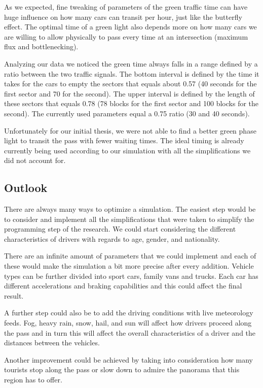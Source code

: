 \documentclass[11pt,a4paper,parskip=half-]{article}
\begin{document}
As we expected, fine tweaking of parameters of the green traffic time can have huge influence on how many cars can transit per hour, just like the butterfly effect. The optimal time of a green light also depends more on how many cars we are willing to allow physically to pass every time at an intersection (maximum flux and bottlenecking). 



Analyzing our data we noticed the green time always falls in a range defined by a ratio between the two traffic signals. The bottom interval is defined by the time it takes for the cars to empty the sectors that equals about 0.57 (40 seconds for the first sector and 70 for the second). The upper interval is defined by the length of these sectors that equals 0.78 (78 blocks for the first sector and 100 blocks for the second). The currently used parameters equal a 0.75 ratio (30 and 40 seconds). 


Unfortunately for our initial thesis, we were not able to find a better green phase light to transit the pass with fewer waiting times. The ideal timing is already currently being used according to our simulation with all the simplifications we did not account for. 




\subsection{Outlook}

There are always many ways to optimize a simulation. The easiest step would be to consider and implement all the simplifications that were taken to simplify the programming step of the research. We could start considering the different characteristics of drivers with regards to age, gender, and nationality.

There are an infinite amount of parameters that we could implement and each of these would make the simulation a bit more precise after every addition. Vehicle types can be further divided into sport cars, family vans and trucks. Each car has different accelerations and braking capabilities and this could affect the final result.

A further step could also be to add the driving conditions with live meteorology feeds. Fog, heavy rain, snow, hail, and sun will affect how drivers proceed along the pass and in turn this will affect the overall characteristics of a driver and the distances between the vehicles. 

Another improvement could be achieved by taking into consideration how many tourists stop along the pass or slow down to admire the panorama that this region has to offer.
\end{document}
